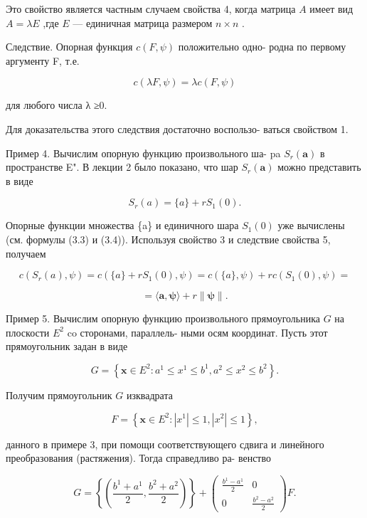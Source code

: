 \documentclass[8pt]{extarticle}
\begin{document}
Это свойство является частным случаем свойства 4, когда матрица \(A\) имеет вид \(A = {\lambda E}\) ,где \(E\) — единичная матрица размером \(n \times  n\) .

Следствие. Опорная функция \(c\left( {F,\psi }\right)\) положительно одно- родна по первому аргументу F, т.е.

\[
c\left( {{\lambda F},\psi }\right)  = {\lambda c}\left( {F,\psi }\right)
\]

для любого числа λ ≥0.

Для доказательства этого следствия достаточно воспользо- ваться свойством 1.

Пример 4. Вычислим опорную функцию произвольного ша- pa \({S}_{r}\left( \mathbf{a}\right)\) в пространстве E". В лекции 2 было показано, что шар \({S}_{r}\left( \mathbf{a}\right)\) можно представить в виде

\[
{S}_{r}\left( a\right)  = \{ a\}  + r{S}_{1}\left( 0\right) .
\]

Опорные функции множества \{a\} и единичного шара \({S}_{1}\left( 0\right)\) уже вычислены (см. формулы (3.3) и (3.4)). Используя свойство 3 и следствие свойства 5, получаем

\[
c\left( {{S}_{r}\left( a\right) ,\psi }\right)  = c\left( {\{ a\}  + r{S}_{1}\left( 0\right) ,\psi }\right)  = c\left( {\{ a\} ,\psi }\right)  + {rc}\left( {{S}_{1}\left( 0\right) ,\psi }\right)  =
\]

\[
= \langle \mathbf{a},\mathbf{\psi }\rangle  + r\parallel \mathbf{\psi }\parallel .
\]

Пример 5. Вычислим опорную функцию произвольного прямоугольника \(G\) на плоскости \({E}^{2}\) co сторонами, параллель- ными осям координат. Пусть этот прямоугольник задан в виде

\[
G = \left\{  {\mathbf{x} \in  {E}^{2} : {a}^{1} \leq  {x}^{1} \leq  {b}^{1},{a}^{2} \leq  {x}^{2} \leq  {b}^{2}}\right\}  .
\]

Получим прямоугольник \(G\) изквадрата

\[
F = \left\{  {\mathbf{x} \in  {E}^{2} : \left| {x}^{1}\right|  \leq  1,\left| {x}^{2}\right|  \leq  1}\right\}  ,
\]

данного в примере 3, при помощи соответствующего сдвига и линейного преобразования (растяжения). Тогда справедливо ра- венство

\[
G = \left\{  \left( {\frac{{b}^{1} + {a}^{1}}{2},\frac{{b}^{2} + {a}^{2}}{2}}\right) \right\}   + \left( \begin{array}{cc} \frac{{b}^{1} - {a}^{1}}{2} & 0 \\  0 & \frac{{b}^{2} - {a}^{2}}{2} \end{array}\right) F.
\]
\end{document}
